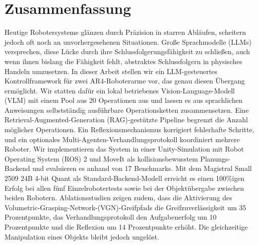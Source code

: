 \documentclass[
     12pt,
     a4paper,
     BCOR=10mm,
     DIV=14,
     listof=totoc,
     bibliography=totoc,
     parskip,
     twoside,
     headsepline
     ]{scrreprt}
\begin{document}
\section*{Zusammenfassung}
Heutige Robotersysteme glänzen durch Präzision in starren Abläufen, scheitern jedoch oft noch an unvorhergesehenen Situationen. Große Sprachmodelle (LLMs) versprechen, diese Lücke durch ihre Schlussfolgerungsfähigkeit zu schließen, auch wenn ihnen bislang die Fähigkeit fehlt, abstraktes Schlussfolgern in physisches Handeln umzusetzen. In dieser Arbeit stellen wir ein LLM-gesteuertes Kontrollframework für zwei AR4-Roboterarme vor, das genau diesen Übergang ermöglicht. Wir statten dafür ein lokal betriebenes Vision-Language-Modell (VLM) mit einem Pool aus 20 Operationen aus und lassen es aus sprachlichen Anweisungen selbstständig ausführbare Operationsketten zusammensetzen. Eine Retrieval-Augmented-Generation (RAG)-gestützte Pipeline begrenzt die Anzahl möglicher Operationen. Ein Reflexionsmechanismus korrigiert fehlerhafte Schritte, und ein optionales Multi-Agenten-Verhandlungsprotokoll koordiniert mehrere Roboter. Wir implementieren das System in einer Unity-Simulation mit Robot Operating System (ROS) 2 und MoveIt als kollisionsbewusstem Planungs-Backend und evaluieren es anhand von 17 Benchmarks. Mit dem Magistral Small 2509 24B 4-bit Quant als Standard-Backend-Modell erreicht es einen 100\%igen Erfolg bei allen fünf Einzelrobotertests sowie bei der Objektübergabe zwischen beiden Robotern. Ablationsstudien zeigen zudem, dass die Aktivierung des Volumetric-Grasping-Network-(VGN)-Greifpfads die Greifzuverlässigkeit um 35 Prozentpunkte, das Verhandlungsprotokoll den Aufgabenerfolg um 10 Prozentpunkte und die Reflexion um 14 Prozentpunkte erhöht. Die gleichzeitige Manipulation eines Objekts bleibt jedoch ungelöst.

\cleardoublepage

\tableofcontents
\clearpage

\printnoidxglossary[
	type=\acronymtype,
	title=List of Abbreviations,
	nonumberlist,
	style=listdotted,
	nogroupskip,
]

\cleardoublepage


\cleardoublepage

\glsresetall










\newpage




\newpage
\clearpage
\appendix






\end{document}
